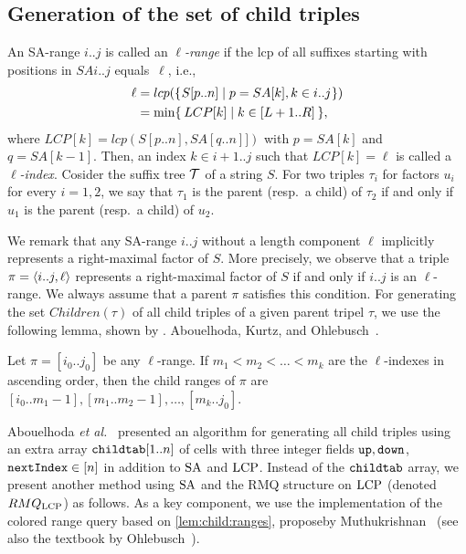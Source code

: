 \documentclass{article}
\begin{document}
\subsection{Generation of the set of child triples}
An SA-range $i..j$ is called an \textit{$\ell$-range} if the lcp of all suffixes starting  with positions in $SAi..j$ equals~$\ell$, i.e.,
\begin{align}
  \ell
  &= lcp(\{\kern0.05em S[p..n] \mid p = SA[k], k \in i..j \kern0.05em\} ) 
\\&= \min\{\kern0.2em LCP[k] \mid k \in [L+1..R] \kern0.2em\},   
\end{align}
where $LCP[k] = lcp(S[p..n], SA[q..n]])$ with $p = SA[k]$ and $q = SA[k-1]$. 
Then, an index $k \in i+1..j$ such that $LCP[k] = \ell$ is called a \textit{$\ell$-index}. 
Cosider the suffix tree $\mathcal{T}$ of a string $S$.
For two triples $\tau_i$ for factors $u_i$ for every $i = 1,2$, we say that $\tau_1$ is the parent (resp.~a child) of $\tau_2$ if and only if $u_1$ is the parent (resp.~a child) of $u_2$.

We remark that any SA-range $i..j$ without a length component $\ell$ implicitly represents a right-maximal factor of $S$. More precisely, we observe that a triple $\pi = \langle i..j, \ell\rangle$ represents a right-maximal factor of $S$ if and only if $i..j$ is an $\ell$-range. We always assume that a parent $\pi$ satisfies this condition. 
For generating the set $Children(\tau)$ of all child triples of a given parent tripel $\tau$, we use the following lemma, shown by . Abouelhoda, Kurtz, and Ohlebusch~\cite{abouelhoda2004replacing}. 

\begin{lemma}\label{lem:child:ranges}
  Let $\pi = [i_0..j_0]$ be any $\ell$-range.
  If $m_1 < m_2 < \dots < m_k$ are the $\ell$-indexes in ascending order, then the child ranges of $\pi$ are
  $[i_0..m_1-1], 
   [m_1..m_2-1], 
   \ldots,
   [m_k..j_0]$.  
\end{lemma}

Abouelhoda \textit{et al.}~\cite{abouelhoda2004replacing} presented an algorithm for generating all child triples using an extra array $\mathtt{childtab}[1..n]$ of cells with three integer fields $\mathtt{up}, \mathtt{down}$, $\mathtt{nextIndex} \in [n]$ in addition to $\mathrm{SA}$ and $\mathrm{LCP}$. 
Instead of the $\mathtt{childtab}$ array, we present another method using $\mathrm{SA}$ and the RMQ structure on $\mathrm{LCP}$ (denoted $RMQ_{\mathrm{LCP}}$) as follows.%
As a key component,
we use the implementation of the colored range query
based on \cref{lem:child:ranges}, proposeby Muthukrishnan~\cite{muthukrishnan2002efficient} (see also the textbook by Ohlebusch~\cite{ohlebusch2013bookbioinfo}).
\end{document}
